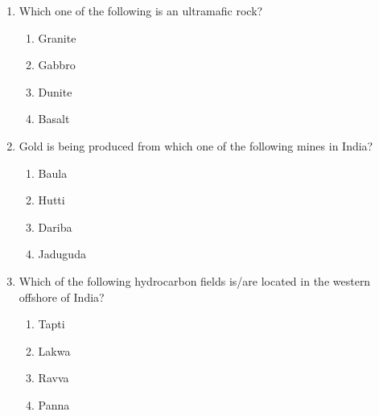 \documentclass[journal,12pt,onecolumn]{IEEEtran}
\begin{document}
\begin{enumerate}
\hfill{}

\begin{multicols}{2}
\begin{enumerate}
    \item Wenner
    \item Schlumberger
    \item Dipole-Dipole
    \item Pole-Pole
\end{enumerate}
\end{multicols}

\item Which one of the following is an ultramafic rock?

\hfill{}

\begin{multicols}{4}
\begin{enumerate}
    \item Granite
    \item Gabbro
    \item Dunite
    \item Basalt
\end{enumerate}
\end{multicols}


\newpage

\item Gold is being produced from which one of the following mines in India?

\hfill{}

\begin{multicols}{2}
\begin{enumerate}
    \item Baula
    \item Hutti
    \item Dariba
    \item Jaduguda
\end{enumerate}
\end{multicols}

\item Which of the following hydrocarbon fields is/are located in the western offshore of India?

\hfill{}

\begin{multicols}{2}
\begin{enumerate}
    \item Tapti
    \item Lakwa
    \item Ravva
    \item Panna
\end{enumerate}
\end{multicols}


\end{enumerate}
\end{document}
